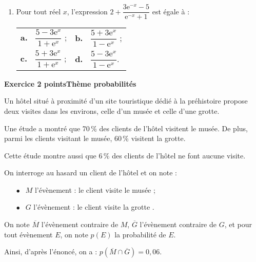 \documentclass[10pt,a4paper]{article}
\begin{document}
\begin{enumerate}
\item Pour tout réel $x$, l'expression $2 + \dfrac{3\text{e}^{-x} - 5}{\text{e}^{-x} + 1}$ est égale à : 

\begin{center}
\begin{tabularx}{\linewidth}{*{2}{X}}
\textbf{a.~} $\dfrac{5 - 3\text{e}^x}{1 + \text{e}^x}$ ;&\textbf{b.~} $\dfrac{5 + 3\text{e}^x}{1 - \text{e}^x}$ ;\\[8pt]
\textbf{c.~} $\dfrac{5 + 3\text{e}^x}{1 + \text{e}^x}$ ;&\textbf{d.~} $\dfrac{5 - 3\text{e}^x}{1 - \text{e}^x}$.
\end{tabularx}
\end{center}
\end{enumerate}

\bigskip

\textbf{Exercice 2  points\hfill Thème probabilités}

\medskip

Un hôtel situé à proximité d'un site touristique dédié à la préhistoire propose deux visites dans les environs, celle d'un musée et celle d'une grotte.

\medskip

Une étude a montré que 70\,\% des clients de l'hôtel visitent le musée. De plus, parmi les clients visitant le musée, 60\,\% visitent la grotte.

Cette étude montre aussi que 6\,\% des clients de l'hôtel ne font aucune visite.

On interroge au hasard un client de l'hôtel et on note :

\begin{itemize}
\item[$\bullet~~$] $M$ l'évènement : \og le client visite le musée \fg{} ;
\item[$\bullet~~$] $G$ l'évènement : \og le client visite la grotte \fg.
\end{itemize}

On note $\overline{M}$ l'évènement contraire de $M$,\: $\overline{G}$ l'évènement contraire de $G$, et pour tout évènement $E$, on note $p(E)$ la probabilité de $E$.

Ainsi, d'après l'énoncé, on a : $p\left(\overline{M} \cap \overline{G}\right) = 0,06$.

\medskip
\end{document}
